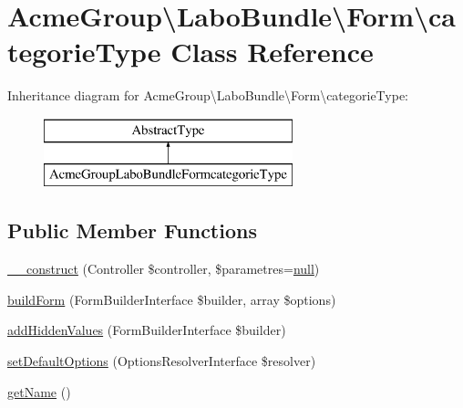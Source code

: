 \hypertarget{class_acme_group_1_1_labo_bundle_1_1_form_1_1categorie_type}{\section{Acme\+Group\textbackslash{}Labo\+Bundle\textbackslash{}Form\textbackslash{}categorie\+Type Class Reference}
\label{class_acme_group_1_1_labo_bundle_1_1_form_1_1categorie_type}
}
Inheritance diagram for Acme\+Group\textbackslash{}Labo\+Bundle\textbackslash{}Form\textbackslash{}categorie\+Type\+:\begin{figure}[H]
\begin{center}
\leavevmode
\includegraphics[height=2.000000cm]{class_acme_group_1_1_labo_bundle_1_1_form_1_1categorie_type}
\end{center}
\end{figure}
\subsection*{Public Member Functions}
\begin{DoxyCompactItemize}
\item 
\hyperlink{class_acme_group_1_1_labo_bundle_1_1_form_1_1categorie_type_a82a68dd017ca5fe8fc955d6eb21123d4}{\+\_\+\+\_\+construct} (Controller \$controller, \$parametres=\hyperlink{validate_8js_afb8e110345c45e74478894341ab6b28e}{null})
\item 
\hyperlink{class_acme_group_1_1_labo_bundle_1_1_form_1_1categorie_type_aea537d1433b86dc2d6f2b0748c85bf16}{build\+Form} (Form\+Builder\+Interface \$builder, array \$options)
\item 
\hyperlink{class_acme_group_1_1_labo_bundle_1_1_form_1_1categorie_type_a2151d05a39efcd56c8f3b90f848439ea}{add\+Hidden\+Values} (Form\+Builder\+Interface \$builder)
\item 
\hyperlink{class_acme_group_1_1_labo_bundle_1_1_form_1_1categorie_type_a5f335a88ddb9941801e204943c2d9c51}{set\+Default\+Options} (Options\+Resolver\+Interface \$resolver)
\item 
\hyperlink{class_acme_group_1_1_labo_bundle_1_1_form_1_1categorie_type_a38753ee14649761b90126732615b3b00}{get\+Name} ()
\end{DoxyCompactItemize}


